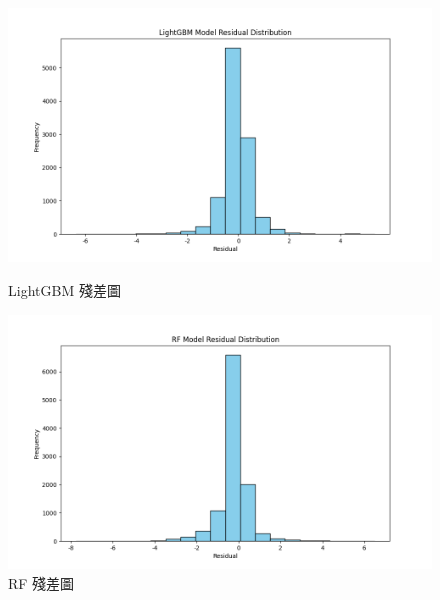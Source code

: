\documentclass[12pt,a4paper]{article}
\begin{document}
\begin{enumerate}
\begin{enumerate}[label=\arabic*.]
\begin{enumerate}[label=3-2-\arabic*.]
\begin{enumerate}[label=\Alph*.]
\begin{figure}[H]
\begin{minipage}{0.45\textwidth}
                            \centering
                            \includegraphics[width=\textwidth]{resources/image/ResidualPlot/LightGBM.png}
                            \caption{LightGBM 殘差圖}
                            \label{fig:residual_lightgbm}
                        \end{minipage}
                        \begin{minipage}{0.45\textwidth}
                            \centering
                            \includegraphics[width=\textwidth]{resources/image/ResidualPlot/RF.png}
                            \caption{RF 殘差圖}
                            \label{fig:residual_rf}
                        \end{minipage}
                        \begin{minipage}{0.45\textwidth}
                            \centering

\end{minipage}
\end{figure}
\end{enumerate}
\end{enumerate}
\end{enumerate}
\end{enumerate}
\end{document}
